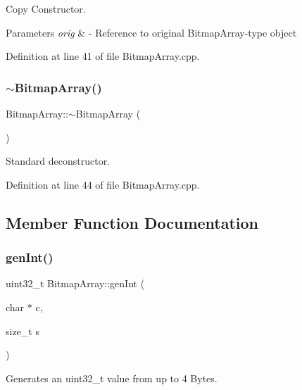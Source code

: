 Copy Constructor. 


\begin{DoxyParams}{Parameters}
{\em orig} & -\/ Reference to original Bitmap\+Array-\/type object \\
\hline
\end{DoxyParams}


Definition at line 41 of file Bitmap\+Array.\+cpp.

\mbox{\label{classBitmapArray_acc21c3148de08fb85d2939821f9f2cf0}} 
\subsubsection{\texorpdfstring{$\sim$BitmapArray()}{~BitmapArray()}}
{\footnotesize\ttfamily Bitmap\+Array\+::$\sim$\+Bitmap\+Array (\begin{DoxyParamCaption}{ }\end{DoxyParamCaption})\hspace{0.3cm}{\ttfamily [virtual]}}

Standard deconstructor. 

Definition at line 44 of file Bitmap\+Array.\+cpp.



\subsection{Member Function Documentation}
\mbox{\label{classBitmapArray_a158fbbaa026332a732f644a8c368a2f0}} 
\subsubsection{\texorpdfstring{genInt()}{genInt()}}
{\footnotesize\ttfamily uint32\+\_\+t Bitmap\+Array\+::gen\+Int (\begin{DoxyParamCaption}\item[{char $\ast$}]{c,  }\item[{size\+\_\+t}]{s }\end{DoxyParamCaption})\hspace{0.3cm}{\ttfamily [private]}}



Generates an uint32\+\_\+t value from up to 4 Bytes. 


